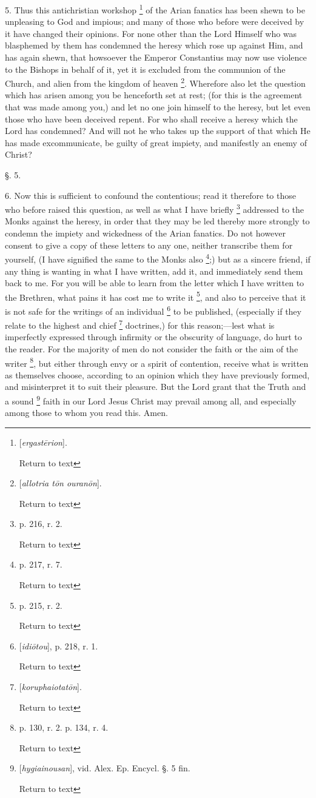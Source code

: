 5. Thus this antichristian workshop \footnote{[\emph{ergast\={e}rion}].

Return to text} of the Arian fanatics has been shewn to be unpleasing to God
and impious; and many of those who before were deceived by it have
changed their opinions. For none other than the Lord Himself who was
blasphemed by them has condemned the heresy which rose up against Him,
and has again shewn, that howsoever the Emperor Constantius may now
use violence to the Bishops in behalf of it, yet it is excluded from
the communion of the Church, and alien from the kingdom of heaven \footnote{[\emph{allotria t\={o}n ouran\={o}n}].

Return to text}. Wherefore also let the question which has arisen among you be
henceforth set at rest; (for this is the agreement that was made among
you,) and let no one join himself to the heresy, but let even those
who have been deceived repent. For who shall receive a heresy which
the Lord has condemned? And will not he who takes up the support of
that which He has made excommunicate, be guilty of great impiety, and
manifestly an enemy of Christ?

§. 5.

6. Now this is sufficient to confound the
contentious; read it therefore to those who before raised this
question, as well as what I have briefly \footnote{p. 216, r. 2.

Return to text} addressed to the Monks against the heresy, in order that they
may be led thereby more strongly to condemn the impiety and wickedness
of the Arian fanatics. Do not however consent to give a copy of these
letters to any one, neither transcribe them for yourself, (I have
signified the same to the Monks also \footnote{p. 217, r. 7.

Return to text};) but as a sincere friend, if any thing is wanting in what I
have written, add it, and immediately send them back to me. For you
will be able to learn from the letter which I have written to the
Brethren, what pains it has cost me to write it \footnote{p. 215, r. 2.

Return to text}, and also to perceive that it is not safe for the writings of
an individual \footnote{[\emph{idi\={o}tou}], p. 218, r. 1.

Return to text} to be
published, (especially if they relate to the highest and chief \footnote{[\emph{koruphaiotat\={o}n}].

Return to text} doctrines,) for this reason;—lest what is imperfectly
expressed through infirmity or the obscurity of language, do hurt to
the reader. For the majority of men do not consider the faith or the
aim of the writer \footnote{p. 130, r. 2. p. 134, r. 4.

Return to text},
but either through envy or a spirit of contention, receive what is
written as themselves choose, according to an opinion which they
have previously formed, and misinterpret it to suit their pleasure.
But the Lord grant that the Truth and a sound \footnote{[\emph{hygiainousan}], vid. Alex. Ep. Encycl. §. 5 fin.

Return to text} faith in our Lord Jesus Christ may prevail among all, and
especially among those to whom you read this. Amen.

